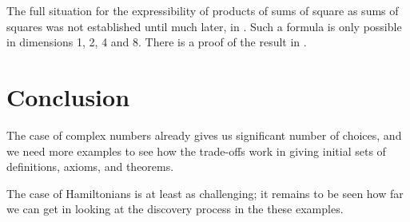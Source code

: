 \documentclass{my-blue-book}
\begin{document}
The full situation for the expressibility of products of sums of square
as sums of squares was not established until much later, in \cite{Hurwitz23}.
Such a formula is only possible in dimensions 1, 2, 4 and 8.  There
is a proof of the result in \cite[pp 67--71]{Conway03}.

\section{Conclusion}
\label{sec:conclusion}

The case of complex numbers already gives us significant number
of choices, and we need more examples to see how the trade-offs work
in giving initial sets of definitions, axioms, and theorems.

The case of Hamiltonians is at least as challenging;  it remains
to be seen how far we can get in looking at the discovery process
in the these examples.

\printbibliography
\end{document}
